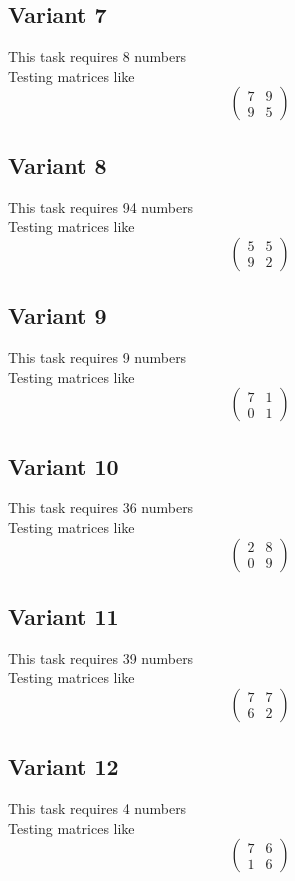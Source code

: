 \documentclass[11pt]{article}
\begin{document}
\subsection*{Variant 7}
This task requires 8 numbers\\
Testing matrices like \[ \begin{pmatrix} 7 & 9\\ 9 & 5 \end{pmatrix} \]

\subsection*{Variant 8}
This task requires 94 numbers\\
Testing matrices like \[ \begin{pmatrix} 5 & 5\\ 9 & 2 \end{pmatrix} \]

\subsection*{Variant 9}
This task requires 9 numbers\\
Testing matrices like \[ \begin{pmatrix} 7 & 1\\ 0 & 1 \end{pmatrix} \]

\subsection*{Variant 10}
This task requires 36 numbers\\
Testing matrices like \[ \begin{pmatrix} 2 & 8\\ 0 & 9 \end{pmatrix} \]

\subsection*{Variant 11}
This task requires 39 numbers\\
Testing matrices like \[ \begin{pmatrix} 7 & 7\\ 6 & 2 \end{pmatrix} \]

\subsection*{Variant 12}
This task requires 4 numbers\\
Testing matrices like \[ \begin{pmatrix} 7 & 6\\ 1 & 6 \end{pmatrix} \]
\end{document}
